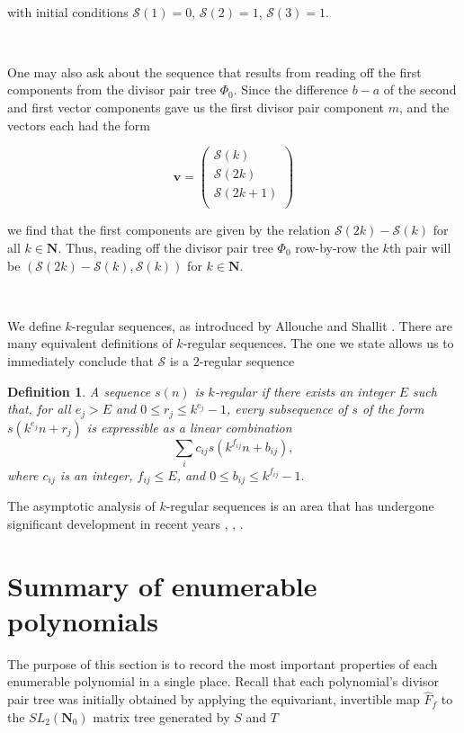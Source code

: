 \documentclass{article}
\newtheorem{definition}[theorem]{Definition}  %
\begin{document}
\

with initial conditions $\mathcal{S}(1) = 0$, $\mathcal{S}(2) = 1$, $\mathcal{S}(3) = 1$. 

\

One may also ask about the sequence that results from reading off the first components  from the divisor pair tree $\Phi_0$. Since the difference $b-a$ of the second and first vector components gave us the first divisor pair component $m$, and the vectors each had the form

$$\mathbf{v} = \begin{pmatrix}
\mathcal{S}(k) \\
\mathcal{S}(2k) \\ 
\mathcal{S}(2k+1) \\
\end{pmatrix}$$

we find that the first components are given by the relation $\mathcal{S}(2k) - \mathcal{S}(k)$ for all $k \in \mathbf{N}$. Thus, reading off the divisor pair tree $\Phi_0$ row-by-row the $k$th pair will be $\left( \mathcal{S}(2k) - \mathcal{S}(k), \mathcal{S}(k) \right)$ for $k \in \mathbf{N}$.

\

We define $k$-regular sequences, as introduced by Allouche and Shallit \cite{q_regular_sequences}. There are many equivalent definitions of $k$-regular sequences. The one we state allows us to immediately conclude that $\mathcal{S}$ is a $2$-regular sequence

\begin{definition}
A sequence \(s(n)\) is \(k\)-regular if there exists an integer \(E\) such that, for all \(e_j > E\) and \(0 \leq r_j \leq k^{e_j} - 1\), every subsequence of \(s\) of the form \(s(k^{e_j}n + r_j)\) is expressible as a linear combination
\[
\sum_{i}c_{ij}s(k^{f_{ij}}n+b_{ij}),
\]
where \(c_{ij}\) is an integer, \(f_{ij} \leq E\), and \(0 \leq b_{ij} \leq k^{f_{ij}} - 1.\)
\end{definition}

The asymptotic analysis of $k$-regular sequences is an area that has undergone significant development in recent years \cite{Asymptotics}, \cite{Asymptotics2}, \cite{Asymptotics3}.

\section{Summary of enumerable polynomials}\label{section_summary}

The purpose of this section is to record the most important properties of each enumerable polynomial in a single place. Recall that each polynomial's divisor pair tree was initially obtained by applying the equivariant, invertible map $\hat{F}_f$ to the $SL_2(\mathbf{N}_0)$ matrix tree generated by $S$ and $T$
\end{document}
